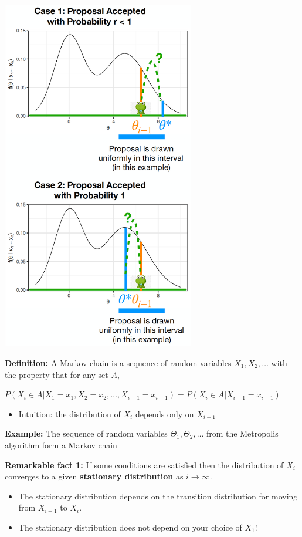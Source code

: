 \documentclass[]{article}
\providecommand{\tightlist}{%
  \setlength{\itemsep}{0pt}\setlength{\parskip}{0pt}}
\begin{document}
\begin{multicols}{2}
\includegraphics[width=3.3in]{mcmc_illustration.png}
\end{multicols}

\newpage

\textbf{Definition:} A Markov chain is a sequence of random variables
\(X_1, X_2, \ldots\) with the property that for any set \(A\),

\(P(X_i \in A | X_1 = x_1, X_2 = x_2, \ldots, X_{i-1} = x_{i-1}) = P(X_i \in A | X_{i-1} = x_{i-1})\)

\begin{itemize}
\tightlist
\item
  Intuition: the distribution of \(X_i\) depends only on \(X_{i-1}\)
\end{itemize}

\textbf{Example:} The sequence of random variables
\(\Theta_1, \Theta_2, \ldots\) from the Metropolis algorithm form a
Markov chain

\textbf{Remarkable fact 1:} If some conditions are satisfied then the
distribution of \(X_i\) converges to a given \textbf{stationary
distribution} as \(i \rightarrow \infty\).

\begin{itemize}
\tightlist
\item
  The stationary distribution depends on the transition distribution for
  moving from \(X_{i-1}\) to \(X_i\).
\item
  The stationary distribution does not depend on your choice of \(X_1\)!
\end{itemize}
\end{document}
